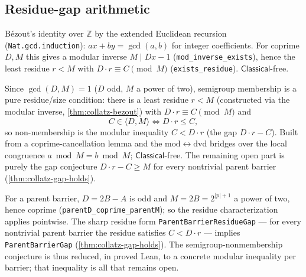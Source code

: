\subsection{Residue-gap arithmetic}

\begin{theorem}
  \label{thm:collatz-bezout}
  \leanok
  B\'ezout's identity over $\mathbb{Z}$ by the extended Euclidean recursion
  (\texttt{Nat.gcd.induction}): $a x + b y = \gcd(a,b)$ for integer
  coefficients. For coprime $D,M$ this gives a modular inverse
  $M \mid D x - 1$ (\texttt{mod\_inverse\_exists}), hence the least residue
  $r<M$ with $D\cdot r\equiv C\pmod M$ (\texttt{exists\_residue}).
  $\mathsf{Classical}$-free.
\end{theorem}

\begin{theorem}
  \label{thm:collatz-residue-gap}
  \leanok
  Since $\gcd(D,M)=1$ ($D$ odd, $M$ a power of two), semigroup membership is a
  pure residue/size condition: there is a least residue $r<M$ (constructed via
  the modular inverse, \cref{thm:collatz-bezout}) with
  $D\cdot r\equiv C\pmod M$ and
  \[
    C\in\langle D,M\rangle \iff D\cdot r\le C,
  \]
  so non-membership is the modular inequality $C<D\cdot r$ (the gap
  $D\cdot r-C$). Built from a coprime-cancellation lemma and the
  $\mathrm{mod}\leftrightarrow\mathrm{dvd}$ bridges over the local congruence
  $a\bmod M=b\bmod M$; $\mathsf{Classical}$-free. The remaining open part is
  purely the gap conjecture $D\cdot r-C\ge M$ for every nontrivial parent
  barrier (\cref{thm:collatz-gap-holds}).
\end{theorem}

\begin{theorem}
  \label{thm:collatz-residue-gap-reduces}
  \leanok
  For a parent barrier, $D=2B-A$ is odd and $M=2B=2^{|p|+1}$ a power of two,
  hence coprime (\texttt{parentD\_coprime\_parentM}); so the residue
  characterization applies pointwise. The sharp residue form
  \texttt{ParentBarrierResidueGap} --- for every nontrivial parent barrier the
  residue satisfies $C<D\cdot r$ --- implies \texttt{ParentBarrierGap}
  (\cref{thm:collatz-gap-holds}). The semigroup-nonmembership conjecture is
  thus reduced, in proved Lean, to a concrete modular inequality per barrier;
  that inequality is all that remains open.
\end{theorem}
